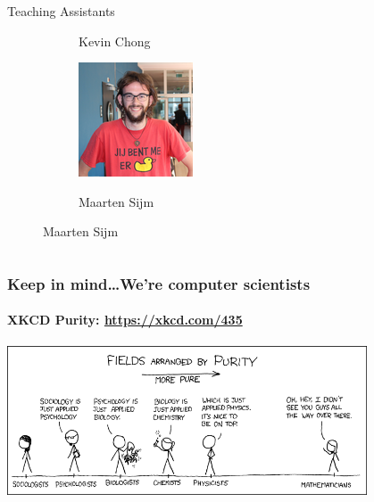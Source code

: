 \begin{frame}
\begin{columns}[t]
\begin{exampleblock}{Teaching Assistants}
\begin{figure}[htpb]
\begin{subfigure}[]{0.4\textwidth}
			\caption*{Kevin Chong}
			\end{subfigure}
			\hfill
			\begin{subfigure}[]{0.4\textwidth}
			\centering
			\includegraphics[width=\textwidth]{figures/maarten.png}\\
			\caption*{Maarten Sijm}
			\end{subfigure}
			
		\end{figure}
			\end{exampleblock}	
	\end{columns}
\end{frame}

\begin{frame}
	\frametitle{Keep in mind\dots We're computer scientists}
	\framesubtitle{XKCD Purity: \url{https://xkcd.com/435}}
	\begin{center}
		\includegraphics[width=0.8\textwidth]{figures/purity.png}
	\end{center}
\end{frame}


